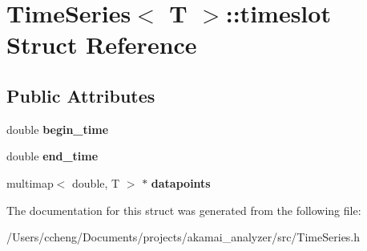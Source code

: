 \hypertarget{struct_time_series_1_1timeslot}{}\section{Time\+Series$<$ T $>$\+:\+:timeslot Struct Reference}
\label{struct_time_series_1_1timeslot}
\subsection*{Public Attributes}
\begin{DoxyCompactItemize}
\item 
\mbox{\label{struct_time_series_1_1timeslot_ae8f4583682c3aaad6faeaf9f33d6a049}} 
double {\bfseries begin\+\_\+time}
\item 
\mbox{\label{struct_time_series_1_1timeslot_afd515f71689dd357c69711f9275f9788}} 
double {\bfseries end\+\_\+time}
\item 
\mbox{\label{struct_time_series_1_1timeslot_afa4468e18eb7664e7c705969f92ad41b}} 
multimap$<$ double, T $>$ $\ast$ {\bfseries datapoints}
\end{DoxyCompactItemize}


The documentation for this struct was generated from the following file\+:\begin{DoxyCompactItemize}
\item 
/\+Users/ccheng/\+Documents/projects/akamai\+\_\+analyzer/src/Time\+Series.\+h\end{DoxyCompactItemize}
